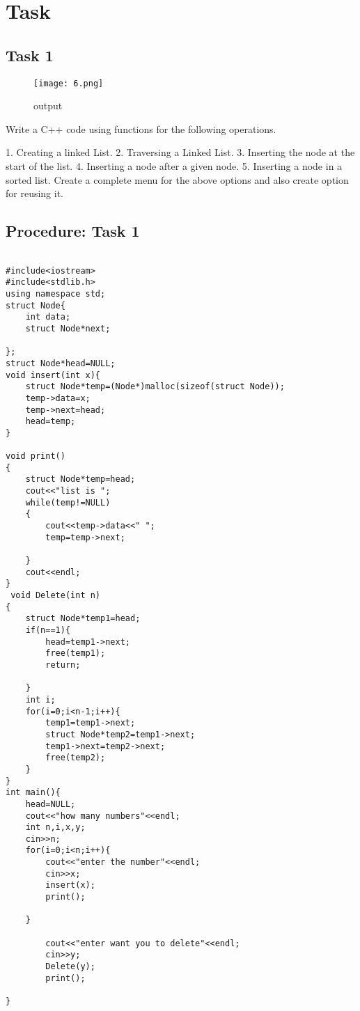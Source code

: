 \documentclass[11pt]{article}            %
\begin{document}
\section{Task}  

\subsection{ Task 1 }     
\begin{figure*}
\centering
  \texttt{[image: 6.png]}
\caption{output}
\label{Figure:3}    
\end{figure*}

Write a C++ code using functions for the following operations. 
 
1. 
Creating a linked List. 
2. 
Traversing a Linked List. 
3. 
Inserting the node at the start of the list. 
4. 
Inserting a node after a given node. 
5. 
Inserting a node in a sorted list. 
Create a complete menu for the above options and also create option for reusing 
it. 
 

\subsection{Procedure: Task 1 }    
 

\begin{lstlisting}

#include<iostream>
#include<stdlib.h>
using namespace std;
struct Node{
	int data;
	struct Node*next;
	
};
struct Node*head=NULL;
void insert(int x){
	struct Node*temp=(Node*)malloc(sizeof(struct Node));
	temp->data=x;
	temp->next=head;
	head=temp;
}

void print()
{
	struct Node*temp=head;
	cout<<"list is ";
	while(temp!=NULL)
	{
		cout<<temp->data<<" ";
		temp=temp->next;
		
	}
	cout<<endl;
}
 void Delete(int n)
{
	struct Node*temp1=head;
	if(n==1){
		head=temp1->next;
		free(temp1);
		return;
		
	}
	int i;
	for(i=0;i<n-1;i++){
		temp1=temp1->next;
		struct Node*temp2=temp1->next;
		temp1->next=temp2->next;
		free(temp2);
	}
}
int main(){
	head=NULL;
	cout<<"how many numbers"<<endl;
	int n,i,x,y;
	cin>>n;
	for(i=0;i<n;i++){
		cout<<"enter the number"<<endl;
		cin>>x;
		insert(x);
		print();
	
	}
	
		cout<<"enter want you to delete"<<endl;
		cin>>y;
		Delete(y);
		print();
	
}
\end{lstlisting}


 
\end{document}
